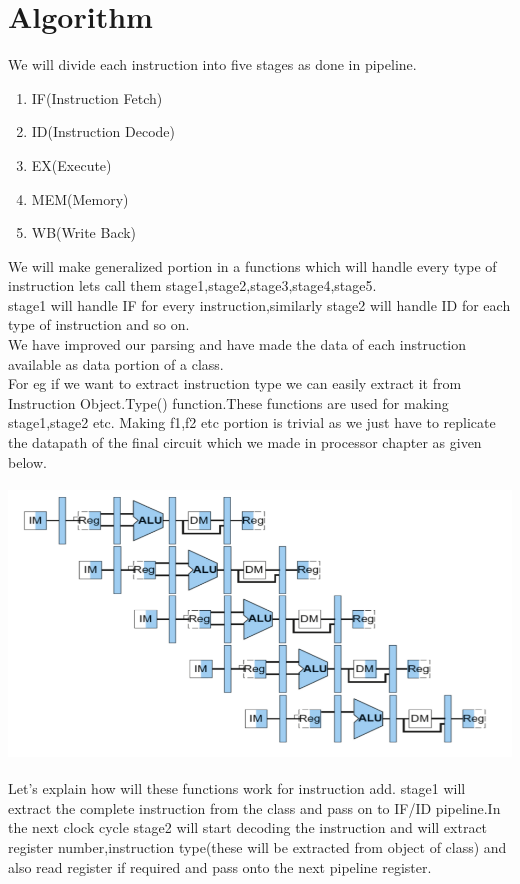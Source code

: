 \documentclass[12pt]{extarticle}
\begin{document}
\section{Algorithm}
We will divide each instruction into five stages as done in pipeline.
\begin{enumerate}
\item IF(Instruction Fetch)
\item ID(Instruction Decode)
\item EX(Execute)
\item MEM(Memory)
\item WB(Write Back)
\end{enumerate}
We will make generalized portion in a functions which will handle every type of instruction lets call them stage1,stage2,stage3,stage4,stage5.\\
stage1 will handle IF for every instruction,similarly stage2 will handle ID for each type of instruction and so on.\\
We have improved our parsing and have made the data of each instruction available as data portion of a class.\\
For eg if we want to extract instruction type we can easily extract it from {Instruction Object}.Type() function.These functions are used for making stage1,stage2 etc. Making f1,f2 etc portion is trivial as we just have to replicate the datapath of the final circuit which we made in processor chapter as given below.\\
\includegraphics[height=8cm, width=14cm]{PC.png}
\\
Let's explain how will these functions work for instruction add.
stage1 will extract the complete instruction from the class and pass on to IF/ID pipeline.In the next clock cycle stage2 will start decoding the instruction and will extract register number,instruction type(these will be extracted from object of class) and also read register if required and pass onto the next pipeline register.
\end{document}
